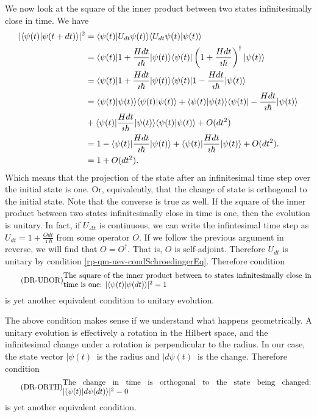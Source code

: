 We now look at the square of the inner product between two states infinitesimally close in time. We have
\begin{equation}
	\begin{aligned}
		|\langle\psi(t) | \psi(t + dt)\rangle|^2 &= \langle \psi(t) | U_{d t} \psi(t)\rangle \langle U_{d t} \psi(t) | \psi(t)\rangle \\
		&=\langle  \psi(t) | 1 + \frac{H dt}{\imath \hbar} | \psi(t)\rangle \langle\psi(t) | \left(1 + \frac{H dt}{\imath \hbar} \right)^{\dagger}| \psi(t)\rangle \\
		&=\langle  \psi(t) | 1 + \frac{H dt}{\imath \hbar} | \psi(t)\rangle \langle\psi(t) | 1 - \frac{H dt}{\imath \hbar} | \psi(t)\rangle \\
		&=\langle \psi(t) | \psi(t)\rangle \langle \psi(t) | \psi(t)\rangle + \langle  \psi(t) | \psi(t)\rangle \langle\psi(t) | - \frac{H dt}{\imath \hbar} | \psi(t)\rangle \\
		&+ \langle \psi(t) | \frac{H dt}{\imath \hbar} | \psi(t)\rangle \langle\psi(t) | \psi(t)\rangle + O(dt^2)\\
		&=1 - \langle\psi(t) | \frac{H dt}{\imath \hbar} | \psi(t)\rangle + \langle\psi(t) | \frac{H dt}{\imath \hbar} | \psi(t)\rangle+ O(dt^2). \\
		&=1 + O(dt^2).
	\end{aligned}
\end{equation}
Which means that the projection of the state after an infinitesimal time step over the initial state is one. Or, equivalently, that the change of state is orthogonal to the initial state. Note that the converse is true as well. If the square of the inner product between two states infinitesimally close in time is one, then the evolution is unitary. In fact, if $U_{\Delta t}$ is continuous, we can write the infintesimal time step as $U_{d t} = 1 + \frac{O dt}{\imath \hbar}$ from some operator $O$. If we follow the previous argument in reverse, we will find that $O = O^\dagger$. That is, $O$ is self-adjoint. Therefore $U_{dt}$ is unitary by condition \ref{rp-qm-uev-condSchroedingerEq}. Therefore condition
\begin{equation}\label{rp-qm-uev-condUnitaryBorn}
	\tag{DR-UBOR}
	\eqtext{The square of the inner product between to states infinitesimally close in time is one: $|\< \psi(t) | \psi(dt) \> |^2 = 1$} 
\end{equation}
is yet another equivalent condition to unitary evolution.

The above condition makes sense if we understand what happens geometrically. A unitary evolution is effectively a rotation in the Hilbert space, and the infinitesimal change under a rotation is perpendicular to the radius. In our case, the state vector $|\psi(t)\>$ is the radius and $|d\psi(t)\>$ is the change. Therefore condition
\begin{equation}\label{rp-qm-uev-condOrthogonalChange}
	\tag{DR-ORTH}
	\eqtext{The change in time is orthogonal to the state being changed: $|\< \psi(t) | d\psi(dt) \> |^2 = 0$} 
\end{equation}
is yet another equivalent condition.

